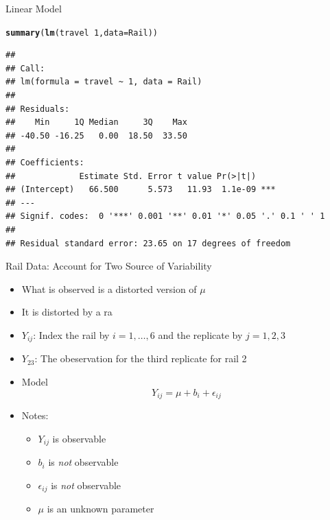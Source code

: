 \documentclass[xcolor=x11names,compress]{beamer}\usepackage[]{graphicx}\usepackage[]{color}
\makeatletter
\newcommand{\hlnum}[1]{\textcolor[rgb]{0.686,0.059,0.569}{#1}}%
\newcommand{\hlopt}[1]{\textcolor[rgb]{0,0,0}{#1}}%
\newcommand{\hlstd}[1]{\textcolor[rgb]{0.345,0.345,0.345}{#1}}%
\newcommand{\hlkwc}[1]{\textcolor[rgb]{0.333,0.667,0.333}{#1}}%
\newcommand{\hlkwd}[1]{\textcolor[rgb]{0.737,0.353,0.396}{\textbf{#1}}}%
\newenvironment{kframe}{%
 \def\at@end@of@kframe{}%
 \ifinner\ifhmode%
  \def\at@end@of@kframe{\end{minipage}}%
  \begin{minipage}{\columnwidth}%
 \fi\fi%
 \def\FrameCommand##1{\hskip\@totalleftmargin \hskip-\fboxsep
 \colorbox{shadecolor}{##1}\hskip-\fboxsep
     \hskip-\linewidth \hskip-\@totalleftmargin \hskip\columnwidth}%
 \MakeFramed {\advance\hsize-\width
   \@totalleftmargin\z@ \linewidth\hsize
   \@setminipage}}%
 {\par\unskip\endMakeFramed%
 \at@end@of@kframe}
\newenvironment{knitrout}{}{} %
\makeatother
\begin{document}
\begin{frame}[fragile]{Linear Model}
\begin{knitrout}\tiny
{}\color{fgcolor}\begin{kframe}
\begin{alltt}
\hlkwd{summary}\hlstd{(}\hlkwd{lm}\hlstd{(travel}\hlopt{~}\hlnum{1}\hlstd{,}\hlkwc{data}\hlstd{=Rail))}
\end{alltt}
\begin{verbatim}
## 
## Call:
## lm(formula = travel ~ 1, data = Rail)
## 
## Residuals:
##    Min     1Q Median     3Q    Max 
## -40.50 -16.25   0.00  18.50  33.50 
## 
## Coefficients:
##             Estimate Std. Error t value Pr(>|t|)    
## (Intercept)   66.500      5.573   11.93  1.1e-09 ***
## ---
## Signif. codes:  0 '***' 0.001 '**' 0.01 '*' 0.05 '.' 0.1 ' ' 1
## 
## Residual standard error: 23.65 on 17 degrees of freedom
\end{verbatim}
\end{kframe}
\end{knitrout}
\end{frame}

\begin{frame}{Rail Data: Account for Two Source of Variability}
  \begin{itemize}
  \item What is observed is a distorted version of $\mu$
  \item It is distorted by a ra
  \item $Y_{ij}$: Index the rail by $i=1,\ldots,6$ and the replicate by $j=1,2,3$
  \item $Y_{23}$: The obeservation for the third replicate for rail 2
   \item Model
    \begin{equation*}
      Y_{ij}=\mu+b_i+\epsilon_{ij}
    \end{equation*}
    \item Notes:
    \begin{itemize}
    \item  $Y_{ij}$ is observable
    \item $b_i$ is {\it not} observable
    \item  $\epsilon_{ij}$ is {\it not} observable
    \item $\mu$ is an unknown parameter
    \end{itemize}
  \end{itemize}
\end{frame}
\end{document}
